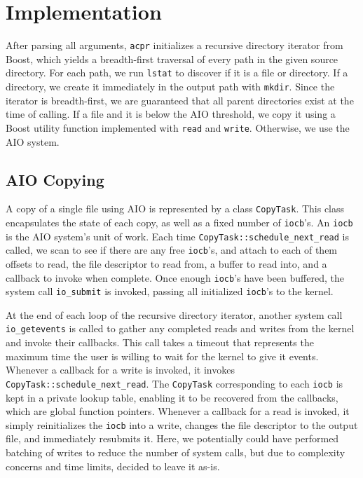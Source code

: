 \documentclass[11pt]{article}
\begin{document}
\section{Implementation}
After parsing all arguments, \texttt{acpr} initializes a recursive directory iterator from Boost, which yields a breadth-first traversal of every path in the given source directory. For each path, we run \texttt{lstat} to discover if it is a file or directory. If a directory, we create it immediately in the output path with \texttt{mkdir}. Since the iterator is breadth-first, we are guaranteed that all parent directories exist at the time of calling. If a file and it is below the AIO threshold, we copy it using a Boost utility function implemented with \texttt{read} and \texttt{write}. Otherwise, we use the AIO system.

\subsection{AIO Copying}
A copy of a single file using AIO is represented by a class \texttt{CopyTask}. This class encapsulates the state of each copy, as well as a fixed number of  \texttt{iocb}'s. An \texttt{iocb} is the AIO system's unit of work. Each time \texttt{CopyTask::schedule\_next\_read} is called, we scan to see if there are any free \texttt{iocb}'s, and attach to each of them offsets to read, the file descriptor to read from, a buffer to read into, and a callback to invoke when complete. Once enough \texttt{iocb}'s have been buffered, the system call \texttt{io\_submit} is invoked, passing all initialized \texttt{iocb}'s to the kernel. 

At the end of each loop of the recursive directory iterator, another system call \texttt{io\_getevents} is called to gather any completed reads and writes from the kernel and invoke their callbacks. This call takes a timeout that represents the maximum time the user is willing to wait for the kernel to give it events. Whenever a callback for a write is invoked, it invokes \texttt{CopyTask::schedule\_next\_read}. The \texttt{CopyTask} corresponding to each \texttt{iocb} is kept in a private lookup table, enabling it to be recovered from the callbacks, which are global function pointers. Whenever a callback for a read is invoked, it simply reinitializes the \texttt{iocb} into a write, changes the file descriptor to the output file, and immediately resubmits it. Here, we potentially could have performed batching of writes to reduce the number of system calls, but due to complexity concerns and time limits, decided to leave it as-is.
\end{document}
